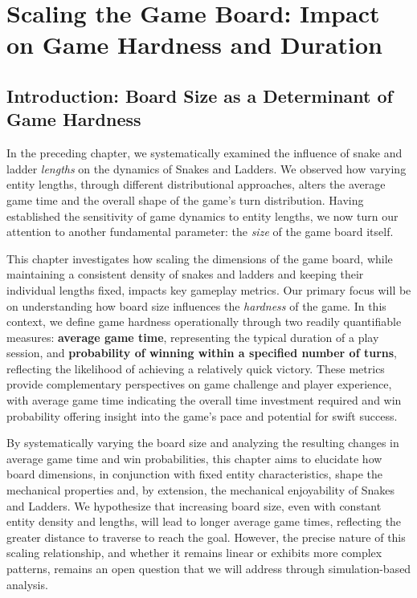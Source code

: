 \chapter{Scaling the Game Board: Impact on Game Hardness and Duration}

\section{Introduction: Board Size as a Determinant of Game Hardness}

In the preceding chapter, we systematically examined the influence of snake and ladder \textit{lengths} on the dynamics of Snakes and Ladders. We observed how varying entity lengths, through different distributional approaches, alters the average game time and the overall shape of the game's turn distribution.  Having established the sensitivity of game dynamics to entity lengths, we now turn our attention to another fundamental parameter: the \textit{size} of the game board itself. 

This chapter investigates how scaling the dimensions of the game board, while maintaining a consistent density of snakes and ladders and keeping their individual lengths fixed, impacts key gameplay metrics.  Our primary focus will be on understanding how board size influences the \textit{hardness} of the game. In this context, we define game hardness operationally through two readily quantifiable measures: \textbf{average game time}, representing the typical duration of a play session, and \textbf{probability of winning within a specified number of turns}, reflecting the likelihood of achieving a relatively quick victory.  These metrics provide complementary perspectives on game challenge and player experience, with average game time indicating the overall time investment required and win probability offering insight into the game's pace and potential for swift success.

By systematically varying the board size and analyzing the resulting changes in average game time and win probabilities, this chapter aims to elucidate how board dimensions, in conjunction with fixed entity characteristics, shape the mechanical properties and, by extension, the mechanical enjoyability of Snakes and Ladders.  We hypothesize that increasing board size, even with constant entity density and lengths, will lead to longer average game times, reflecting the greater distance to traverse to reach the goal. However, the precise nature of this scaling relationship, and whether it remains linear or exhibits more complex patterns, remains an open question that we will address through simulation-based analysis.


